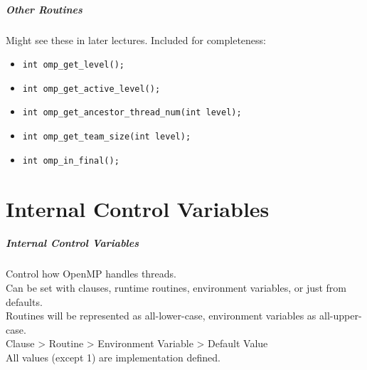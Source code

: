 \documentclass[aspectratio=43]{beamer}
\newenvironment{changemargin}[1]{%
  \begin{list}{}{%
    \setlength{\topsep}{0pt}%
    \setlength{\leftmargin}{#1}%
    \setlength{\rightmargin}{1em}
    \setlength{\listparindent}{\parindent}%
    \setlength{\itemindent}{\parindent}%
    \setlength{\parsep}{\parskip}%
  }%
  \item[]}{\end{list}}
\begin{document}
\begin{frame}
  \frametitle{Other Routines}

  \begin{changemargin}{2cm}
  Might see these in later lectures. Included for
  completeness:

  \begin{itemize}
    \item {\tt int omp\_get\_level();}
    \item {\tt int omp\_get\_active\_level();}
    \item {\tt int omp\_get\_ancestor\_thread\_num(int level);}
    \item {\tt int omp\_get\_team\_size(int level);}
    \item {\tt int omp\_in\_final();}
  \end{itemize}
\end{changemargin}

\end{frame}

\part{Internal Control Variables}
\frame{\partpage}
\begin{frame}
  \frametitle{Internal Control Variables}

  \begin{changemargin}{2cm}

    Control how OpenMP handles threads.\\[1em]
    Can be set with clauses, runtime routines, environment
      variables, or just from defaults.\\[1em]
    Routines will be represented as all-lower-case, environment variables
      as all-upper-case.\\[2em]

    Clause \textgreater\- Routine \textgreater\- Environment Variable \textgreater\- Default Value\\[1em]

    All values (except 1) are implementation defined.
  \end{changemargin}

\end{frame}
\end{document}
